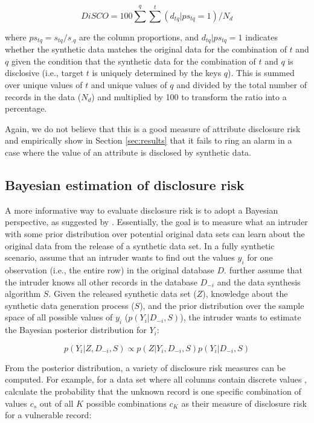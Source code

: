 \documentclass[a4paper,11pt]{style/uneceart}
\begin{document}
\begin{equation}
DiSCO = 100 \sum^{q} \sum^{t} (d_{tq} | ps_{tq} = 1) / N_{d}
\label{eq:DiSCO}
\end{equation}

where $ps_{tq} = s_{tq}/s_{.q}$ are the column proportions, and $d_{tq} | ps_{tq} = 1$ indicates whether the synthetic data matches the original data for the combination of $t$ and $q$ given the condition that the synthetic data for the combination of $t$ and $q$ is disclosive (i.e., target $t$ is uniquely determined by the keys $q$).  This is summed over unique values of $t$ and unique values of $q$ and divided by the total number of records in the data ($N_{d}$) and multiplied by 100 to transform the ratio into a percentage.

Again, we do not believe that this is a good measure of attribute disclosure risk and empirically show in Section \ref{sec:results} that it fails to ring an alarm in a case where the value of an attribute is disclosed by synthetic data.

\subsection{Bayesian estimation of disclosure risk}

A more informative way to evaluate disclosure risk is to adopt a Bayesian perspective, as suggested by \citet{reiter2014bayesian}. Essentially, the goal is to measure what an intruder with some prior distribution over potential original data sets can learn about the original data from the release of a synthetic data set. In a fully synthetic scenario, \citet{reiter2014bayesian} assume that an intruder wants to find out the values $y_i$ for one observation (i.e., the entire row) in the original database $D$. \citet{reiter2014bayesian} further assume that the intruder knows all other records in the database $D_{-i}$ and the data synthesis algorithm $S$. Given the released synthetic data set ($Z$), knowledge about the synthetic data generation process ($S$), and the prior distribution over the sample space of all possible values of $y_i$ ($p(Y_i|D_{-i}, S)$), the intruder wants to estimate the Bayesian posterior distribution for $Y_i$:

\begin{equation*}
    p(Y_i|Z,D_{-i},S) \propto p(Z|Y_i, D_{-i}, S)p(Y_i|D_{-i}, S)
\end{equation*}

From the posterior distribution, a variety of disclosure risk measures can be computed. For example, for a data set where all columns contain discrete values \citet{reiter2014bayesian}, calculate the probability that the unknown record is one specific combination of values $c_s$ out of all $K$ possible combinations $c_K$ as their measure of disclosure risk for a vulnerable record:
\end{document}
